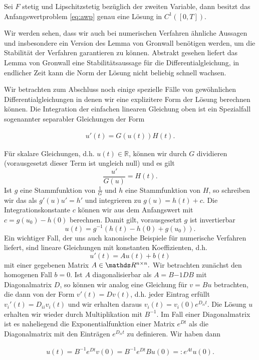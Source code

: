 \begin{theorem}{}{}
Sei $F$ stetig und Lipschitzstetig bezüglich der zweiten Variable, dann besitzt das Anfangswertproblem \eqref{eq:awp} genau eine Lösung in $C^1([0,T])$. 
\end{theorem}

Wir werden sehen, dass wir auch bei numerischen Verfahren ähnliche Aussagen und insbesondere ein Version des Lemma von Gronwall  benötigen werden, um die Stabilität der Verfahren garantieren zu können. Abstrakt gesehen liefert das Lemma von Gronwall eine Stabilitätsaussage für die Differentialgleichung, in endlicher Zeit kann die Norm der Lösung nicht beliebig schnell wachsen. 

Wir betrachten zum Abschluss noch einige spezielle Fälle von gewöhnlichen Differentialgleichungen in denen wir eine explizitere Form der Lösung berechnen können. Die Integration der einfachen linearen Gleichung oben ist ein Spezialfall sogenannter separabler Gleichungen der Form

\begin{align*}
u'(t) = G(u(t)) H(t).
\end{align*}

Für skalare Gleichungen, d.h. $u(t) \in \mathbb{R}$, können wir durch $G$ dividieren (vorausgesetzt dieser Term ist ungleich null) und es gilt 
$$ \frac{u'}{G(u)} = H(t). $$
Ist $g$ eine Stammfunktion von $\frac{1}G$ und $h$ eine Stammfunktion von $H$, so schreiben wir das als
$ g'(u) u' = h'$ und integrieren zu  $g(u) = h(t) + c$. Die Integrationskonstante $c$ können wir aus dem Anfangswert mit 
$c = g(u_0) - h(0)$ berechnen. 
Damit gilt, vorausgesetzt $g$ ist invertierbar
$$ u(t) = g^{-1} (h(t) - h(0) + g(u_0)). $$
%
Ein wichtiger Fall, der uns auch kanonische Beispiele für numerische Verfahren liefert, sind lineare Gleichungen mit konstanten Koeffizienten, d.h. 
$$ u'(t) = A u(t) + b(t) $$
mit einer gegebenen Matrix $A \in \R^{n \times n}.$ Wir betrachten zunächst den homogenen Fall $b=0$. Ist $A$ diagonalisierbar als $A = B{-1} D B$ mit Diagonalmatrix $D$, so können wir analog eine Gleichung für $v = B u$ betrachten, die dann von der Form
$v'(t) = D v(t)$, d.h. jeder Eintrag erfüllt $v_i'(t) = D_{ii} v_i(t)$ und wir erhalten daraus $v_i(t) = v_i(0) e^{D_{ii}t}.$
Die Lösung $u$ erhalten wir wieder durch Multiplikation mit $B^{-1}$. Im Fall einer Diagonalmatrix ist es naheliegend die Exponentialfunktion einer Matrix $e^{Dt}$ als die Diagonalmatrix mit den Einträgen $e^{D_{ii}t}$ zu definieren. Wir haben dann

\begin{align*}
u(t) = B^{-1} e^{Dt} v(0) =  B^{-1} e^{Dt} B u(0) =: e^{At} u(0).
\end{align*}

